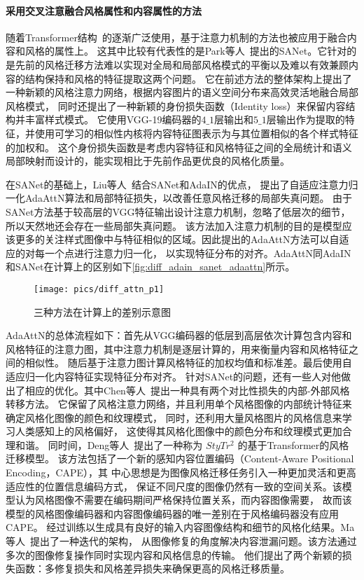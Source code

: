 \paragraph{采用交叉注意融合风格属性和内容属性的方法}
随着Transformer结构~\cite{vaswani2017attention}的逐渐广泛使用，基于注意力机制的方法也被应用于融合内容和风格的属性上。
这其中比较有代表性的是Park等人~\cite{park2019arbitrary}提出的SANet。它针对的是先前的风格迁移方法难以实现对全局和局部风格模式的平衡以及难以有效兼顾内容的结构保持和风格的特征提取这两个问题。
它在前述方法的整体架构上提出了一种新颖的风格注意力网络，根据内容图片的语义空间分布来高效灵活地融合局部风格模式，
同时还提出了一种新颖的身份损失函数（Identity loss）来保留内容结构并丰富样式模式。
它使用VGG-19编码器的$4\_1$层输出和$5\_1$层输出作为提取的特征，并使用可学习的相似性内核将内容特征图表示为与其位置相似的各个样式特征的加权和。
这个身份损失函数是考虑内容特征和风格特征之间的全局统计和语义局部映射而设计的，能实现相比于先前作品更优良的风格化质量。
\par 在SANet的基础上，Liu等人~\cite{liu2021adaattn}结合SANet和AdaIN的优点，
提出了自适应注意力归一化AdaAttN算法和局部特征损失，以改善任意风格迁移的局部失真问题。
由于SANet方法基于较高层的VGG特征输出设计注意力机制，忽略了低层次的细节，所以天然地还会存在一些局部失真问题。
该方法加入注意力机制的目的是模型应该更多的关注样式图像中与特征相似的区域。因此提出的AdaAttN方法可以自适应的对每一个点进行注意力归一化，
以实现特征分布的对齐。AdaAttN同AdaIN和SANet在计算上的区别如下\autoref{fig:diff_adain_sanet_adaattn}所示。
\begin{figure}[htbp]
    \centering
    \texttt{[image: pics/diff\_attn\_p1]}
    \caption{\label{fig:diff_adain_sanet_adaattn}三种方法在计算上的差别示意图~\cite{liu2021adaattn}}
\end{figure}

AdaAttN的总体流程如下：首先从VGG编码器的低层到高层依次计算包含内容和风格特征的注意力图，其中注意力机制是逐层计算的，用来衡量内容和风格特征之间的相似性。
随后基于注意力图计算风格特征的加权均值和标准差。最后使用自适应归一化内容特征实现特征分布对齐。
针对SANet的问题，还有一些人对他做出了相应的优化。其中Chen等人~\cite{chen2021artistic}提出一种具有两个对比性损失的内部-外部风格转移方法。
它保留了风格注意力网络，并且利用单个风格图像的内部统计特征来确定风格化图像的颜色和纹理模式，
同时，还利用大量风格图片的风格信息来学习人类感知上的风格偏好，
这使得其风格化图像中的颜色分布和纹理模式更加合理和谐。
同时间，Deng等人~\cite{deng2022stytr2}提出了一种称为 $StyTr^2$ 的基于Transformer的风格迁移模型。
该方法包括了一个新的感知内容位置编码（Content-Aware Positional Encoding，CAPE），其
中心思想是为图像风格迁移任务引入一种更加灵活和更高适应性的位置信息编码方式，
保证不同尺度的图像仍然有一致的空间关系。该模型认为风格图像不需要在编码期间严格保持位置关系，而内容图像需要，
故而该模型的风格图像编码器和内容图像编码器的唯一差别在于风格编码器没有应用CAPE。
经过训练以生成具有良好的输入内容图像结构和细节的风格化结果。Ma等人~\cite{ma2023rast}提出了一种迭代的架构，
从图像修复的角度解决内容泄漏问题。该方法通过多次的图像修复操作同时实现内容和风格信息的传输。
他们提出了两个新颖的损失函数：多修复损失和风格差异损失来确保更高的风格迁移质量。

